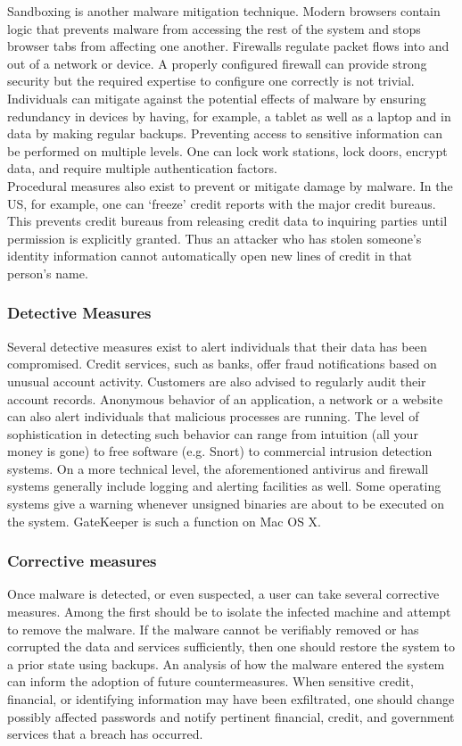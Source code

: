 \documentclass[a4paper]{llncs}
\begin{document}
Sandboxing is another malware mitigation technique. Modern browsers contain logic that prevents malware from accessing the rest of the system and stops browser tabs from affecting one another. Firewalls regulate packet flows into and out of a network or device. A properly configured firewall can provide strong security but the required expertise to configure one correctly is not trivial.\\

Individuals can mitigate against the potential effects of malware by ensuring redundancy in devices by having, for example, a tablet as well as a laptop and in data by making regular backups. Preventing access to sensitive information can be performed on multiple levels. One can lock work stations, lock doors, encrypt data, and require multiple authentication factors.\\

Procedural measures also exist to prevent or mitigate damage by malware. In the US, for example, one can ‘freeze’ credit reports with the major credit bureaus. This prevents credit bureaus from releasing credit data to inquiring parties until permission is explicitly granted. Thus an attacker who has stolen someone’s identity information cannot automatically open new lines of credit in that person’s name.

\subsubsection{Detective Measures}
Several detective measures exist to alert individuals that their data has been compromised. Credit services, such as banks, offer fraud notifications based on unusual account activity. Customers are also advised to regularly audit their account records. Anonymous behavior of an application, a network or a website can also alert individuals that malicious processes are running. The level of sophistication in detecting such behavior can range from intuition (all your money is gone) to free software (e.g. Snort) to commercial intrusion detection systems. On a more technical level, the aforementioned antivirus and firewall systems generally include logging and alerting facilities as well. Some operating systems give a warning whenever unsigned binaries are about to be executed on the system. GateKeeper is such a function on Mac OS X.

\subsubsection{Corrective measures}
Once malware is detected, or even suspected, a user can take several corrective measures. Among the first should be to isolate the infected machine and attempt to remove the malware. If the malware cannot be verifiably removed or has corrupted the data and services sufficiently, then one should restore the system to a prior state using backups. An analysis of how the malware entered the system can inform the adoption of future countermeasures. When sensitive credit, financial, or identifying information may have been exfiltrated, one should change possibly affected passwords and notify pertinent financial, credit, and government services that a breach has occurred.
\end{document}
